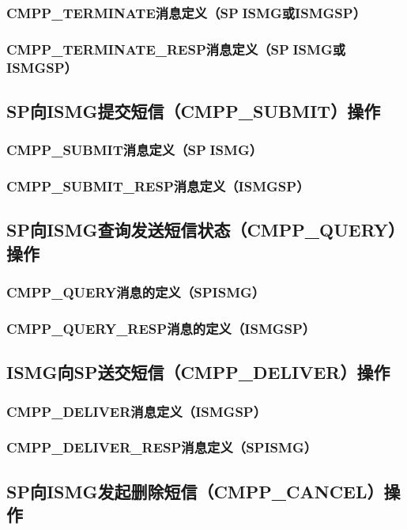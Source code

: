 \documentclass[11pt]{book} %
\begin{document}
\subsubsection{CMPP\_TERMINATE消息定义（SPISMG或ISMG\textrightarrow SP）}
\subsubsection{CMPP\_TERMINATE\_RESP消息定义（SPISMG或ISMG\textrightarrow SP）}
\subsection{SP向ISMG提交短信（CMPP\_SUBMIT）操作}
\subsubsection{CMPP\_SUBMIT消息定义（SPISMG）}
\subsubsection{CMPP\_SUBMIT\_RESP消息定义（ISMG\textrightarrow SP）}
\subsection{SP向ISMG查询发送短信状态（CMPP\_QUERY）操作}
\subsubsection{CMPP\_QUERY消息的定义（SP\textrightarrow ISMG）}
\subsubsection{CMPP\_QUERY\_RESP消息的定义（ISMG\textrightarrow SP）}
\subsection{ISMG向SP送交短信（CMPP\_DELIVER）操作}
\subsubsection{CMPP\_DELIVER消息定义（ISMG\textrightarrow SP）}
\subsubsection{CMPP\_DELIVER\_RESP消息定义（SP\textrightarrow ISMG）}
\subsection{SP向ISMG发起删除短信（CMPP\_CANCEL）操作}
\end{document}
